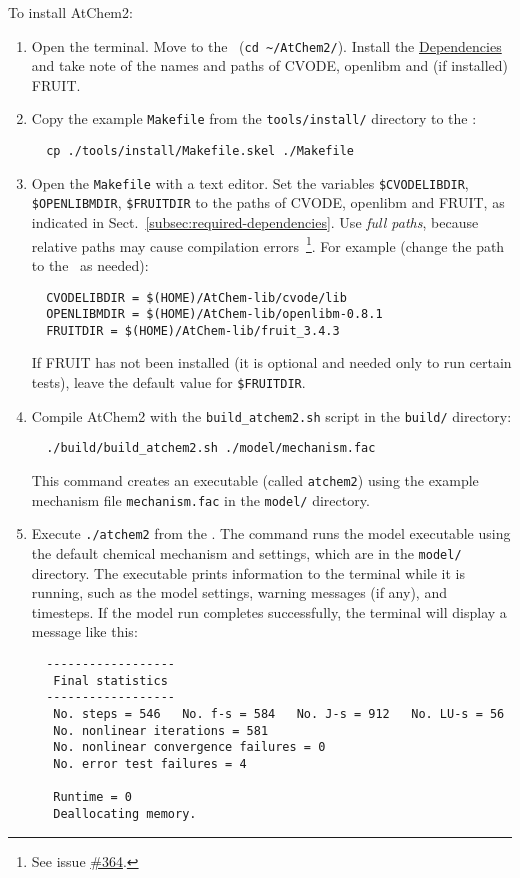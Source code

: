To install AtChem2:

\begin{enumerate}
\item Open the terminal. Move to the \maindir\ (\verb|cd ~/AtChem2/|).
  Install the \hyperref[sec:dependencies]{Dependencies} and take note
  of the names and paths of CVODE, openlibm and (if installed) FRUIT.
\item Copy the example \texttt{Makefile} from the \texttt{tools/install/}
  directory to the \maindir:
  \begin{verbatim}
  cp ./tools/install/Makefile.skel ./Makefile
  \end{verbatim}
\item Open the \texttt{Makefile} with a text editor. Set the variables
  \texttt{\$CVODELIBDIR}, \texttt{\$OPENLIBMDIR}, \texttt{\$FRUITDIR}
  to the paths of CVODE, openlibm and FRUIT, as indicated in
  Sect.~\ref{subsec:required-dependencies}. Use \emph{full paths},
  because relative paths may cause compilation errors~\footnote{See
    issue \href{https://github.com/AtChem/AtChem2/issues/364}{\#364}.}.
  For example (change the path to the \depdir\ as needed):
  \begin{verbatim}
  CVODELIBDIR = $(HOME)/AtChem-lib/cvode/lib
  OPENLIBMDIR = $(HOME)/AtChem-lib/openlibm-0.8.1
  FRUITDIR = $(HOME)/AtChem-lib/fruit_3.4.3
  \end{verbatim}
  If FRUIT has not been installed (it is optional and needed only to
  run certain tests), leave the default value for \texttt{\$FRUITDIR}.
\item Compile AtChem2 with the \texttt{build\_atchem2.sh} script in
  the \texttt{build/} directory:
  \begin{verbatim}
  ./build/build_atchem2.sh ./model/mechanism.fac
  \end{verbatim}
  This command creates an executable (called \texttt{atchem2}) using
  the example mechanism file \texttt{mechanism.fac} in the
  \texttt{model/} directory.
\item Execute \verb|./atchem2| from the \maindir. The command runs the
  model executable using the default chemical mechanism and settings,
  which are in the \texttt{model/} directory. The executable prints
  information to the terminal while it is running, such as the
  model settings, warning messages (if any), and timesteps. If the
  model run completes successfully, the terminal will display a
  message like this:
  \begin{verbatim}
  ------------------
   Final statistics
  ------------------
   No. steps = 546   No. f-s = 584   No. J-s = 912   No. LU-s = 56
   No. nonlinear iterations = 581
   No. nonlinear convergence failures = 0
   No. error test failures = 4

   Runtime = 0
   Deallocating memory.
  \end{verbatim}
\end{enumerate}

